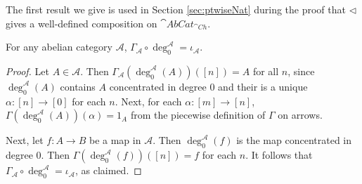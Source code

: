 The first result we give is used in Section \ref{sec:ptwiseNat} during the proof that $\lhd$ gives a well-defined composition on $\cat{AbCat}_{\cat{Ch}}$.

\begin{lem}[label=lem:gammaDeg]
    For any abelian category $\mathcal{A}$, $\Gamma_\mathcal{A}\circ \deg_0^\mathcal{A} = \iota_\mathcal{A}$.
\end{lem}
\begin{proof}
    Let $A \in \mathcal{A}$. Then $\Gamma_\mathcal{A}(\deg_0^\mathcal{A}(A))([n]) = A$ for all $n$, since $\deg_0^\mathcal{A}(A)$ contains $A$ concentrated in degree $0$ and their is a unique $\alpha:[n]\rightarrow [0]$ for each $n$. Next, for each $\alpha:[m]\rightarrow [n]$, $\Gamma(\deg_0^\mathcal{A}(A))(\alpha) = 1_A$ from the piecewise definition of $\Gamma$ on arrows.

    Next, let $f:A\rightarrow B$ be a map in $\mathcal{A}$. Then $\deg_0^\mathcal{A}(f)$ is the map concentrated in degree $0$. Then $\Gamma(\deg_0^\mathcal{A}(f))([n]) = f$ for each $n$. It follows that $\Gamma_\mathcal{A}\circ \deg_0^\mathcal{A} = \iota_\mathcal{A}$, as claimed.
\end{proof}

